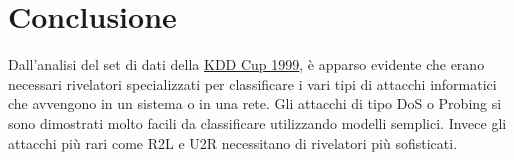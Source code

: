 \documentclass[a4paper,12pt]{article}
\begin{document}
\section{Conclusione} 
Dall'analisi del set di dati della \href{http://kdd.ics.uci.edu/databases/kddcup99/kddcup99.html}{KDD Cup 1999}, è apparso evidente che erano necessari rivelatori specializzati per classificare i vari tipi di attacchi informatici che avvengono in un sistema o in una rete. Gli attacchi di tipo DoS o Probing si sono dimostrati molto facili da classificare utilizzando modelli semplici. Invece gli attacchi più rari come R2L e U2R necessitano di rivelatori più sofisticati.
\end{document}
